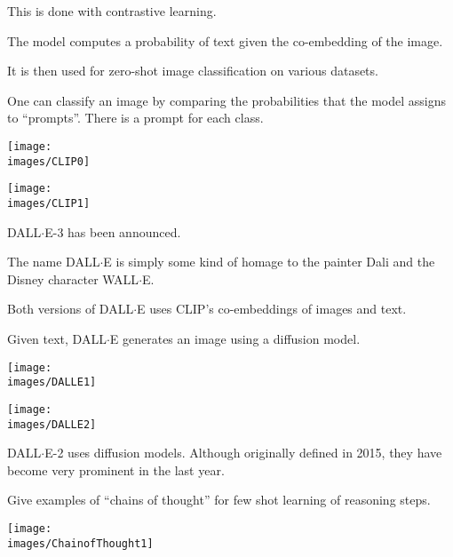 {{\vfill
This is done with contrastive learning.


The model computes a probability of text given the co-embedding of the image.

\vfill
It is then used for zero-shot image classification on various datasets.

\vfill
One can classify an image by comparing the probabilities that the model assigns to ``prompts''.  There is a prompt for each class.


\centerline{\texttt{[image: \\images/CLIP0]}}


\centerline{\texttt{[image: \\images/CLIP1]}}


DALL$\cdot$E-3 has been announced.

\vfill

The name DALL$\cdot$E is simply some kind of homage to the painter Dali and the Disney character WALL$\cdot$E.

\vfill
Both versions of DALL$\cdot$E uses CLIP's co-embeddings of images and text.

\vfill
Given text, DALL$\cdot$E generates an image using a {\color{red} diffusion model}.


\centerline{\texttt{[image: \\images/DALLE1]}}


\centerline{\texttt{[image: \\images/DALLE2]}}


DALL$\cdot$E-2 uses diffusion models.  Although originally defined in 2015, they have become very prominent in the last year.


Give examples of {\color{red} ``chains of thought''} for few shot learning of reasoning steps.


\centerline{\texttt{[image: \\images/ChainofThought1]}}


}}
